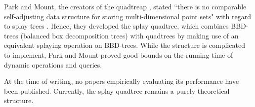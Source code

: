 Park and Mount, the creators of the quadtreap \cite{quadtreap}, stated ``there is no comparable self-adjusting data structure for storing multi-dimensional point sets" with regard to splay trees \cite{splay-quadtree}. Hence, they developed the splay quadtree, which combines BBD-trees (balanced box decomposition trees) with quadtrees by making use of an equivalent splaying operation on BBD-trees. While the structure is complicated to implement, Park and Mount proved good bounds on the running time of dynamic operations and queries.

At the time of writing, no papers empirically evaluating its performance have been published. Currently, the splay quadtree remains a purely theoretical structure.